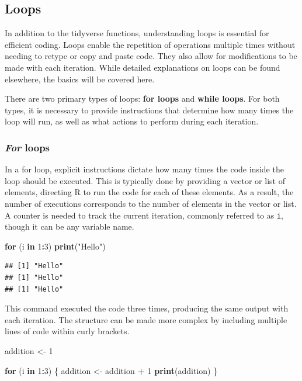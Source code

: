 \documentclass[
]{article}
\newenvironment{Shaded}{\begin{snugshade}}{\end{snugshade}}
\newcommand{\ControlFlowTok}[1]{\textcolor[rgb]{0.13,0.29,0.53}{\textbf{#1}}}
\newcommand{\DecValTok}[1]{\textcolor[rgb]{0.00,0.00,0.81}{#1}}
\newcommand{\FunctionTok}[1]{\textcolor[rgb]{0.13,0.29,0.53}{\textbf{#1}}}
\newcommand{\NormalTok}[1]{#1}
\newcommand{\OtherTok}[1]{\textcolor[rgb]{0.56,0.35,0.01}{#1}}
\newcommand{\SpecialCharTok}[1]{\textcolor[rgb]{0.81,0.36,0.00}{\textbf{#1}}}
\newcommand{\StringTok}[1]{\textcolor[rgb]{0.31,0.60,0.02}{#1}}
\begin{document}
\subsection{Loops}\label{loops}

In addition to the tidyverse functions, understanding loops is essential for efficient coding. Loops enable the repetition of operations multiple times without needing to retype or copy and paste code. They also allow for modifications to be made with each iteration. While detailed explanations on loops can be found elsewhere, the basics will be covered here.

There are two primary types of loops: \textbf{for loops} and \textbf{while loops}. For both types, it is necessary to provide instructions that determine how many times the loop will run, as well as what actions to perform during each iteration.

\subsubsection{\texorpdfstring{\emph{For} loops}{For loops}}\label{for-loops}

In a for loop, explicit instructions dictate how many times the code inside the loop should be executed. This is typically done by providing a vector or list of elements, directing R to run the code for each of these elements. As a result, the number of executions corresponds to the number of elements in the vector or list. A counter is needed to track the current iteration, commonly referred to as \texttt{i}, though it can be any variable name.

\begin{Shaded}
\begin{Highlighting}[]
\ControlFlowTok{for}\NormalTok{ (i }\ControlFlowTok{in} \DecValTok{1}\SpecialCharTok{:}\DecValTok{3}\NormalTok{) }\FunctionTok{print}\NormalTok{(}\StringTok{"Hello"}\NormalTok{)}
\end{Highlighting}
\end{Shaded}

\begin{verbatim}
## [1] "Hello"
## [1] "Hello"
## [1] "Hello"
\end{verbatim}

This command executed the code three times, producing the same output with each iteration. The structure can be made more complex by including multiple lines of code within curly brackets.

\begin{Shaded}
\begin{Highlighting}[]
\NormalTok{addition }\OtherTok{\textless{}{-}} \DecValTok{1}

\ControlFlowTok{for}\NormalTok{ (i }\ControlFlowTok{in} \DecValTok{1}\SpecialCharTok{:}\DecValTok{3}\NormalTok{)}
\NormalTok{\{}
\NormalTok{  addition }\OtherTok{\textless{}{-}}\NormalTok{ addition }\SpecialCharTok{+} \DecValTok{1}
  \FunctionTok{print}\NormalTok{(addition)}
\NormalTok{\}}
\end{Highlighting}
\end{Shaded}
\end{document}
